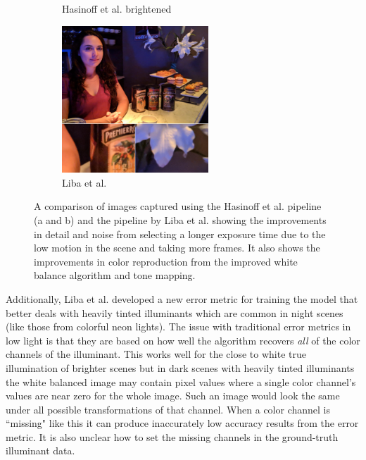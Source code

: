 \documentclass{sig-alternate}
\begin{document}
\begin{figure}
\begin{subfigure}{13pc}
\caption{Hasinoff et al. brightened}
\label{fig:libaResults:Hasinoff}
\end{subfigure}
\begin{subfigure}{13pc}
\centering
\includegraphics[width=13pc]{figures/liba2019-figure-1c-95quality.jpg}
\caption{Liba et al.}
\label{fig:libaResults:liba}
\end{subfigure}

\caption{A comparison of images captured using the Hasinoff et al. pipeline (a and b) and the pipeline by Liba et al. showing the improvements in detail and noise from selecting a longer exposure time due to the low motion in the scene and taking more frames. It also shows the improvements in color reproduction from the improved white balance algorithm and tone mapping.~\cite{Liba2019}}


\label{fig:libaResults}
\end{figure}

Additionally, Liba et al. developed a new error metric for training the model that better deals with heavily tinted illuminants which are common in night scenes (like those from colorful neon lights). The issue with traditional error metrics in low light is that they are based on how well the algorithm recovers \emph{all} of the color channels of the illuminant. This works well for the close to white true illumination of brighter scenes but in dark scenes with heavily tinted illuminants the white balanced image may contain pixel values where a single color channel's values are near zero for the whole image. Such an image would look the same under all possible transformations of that channel. When a color channel is ``missing" like this it can produce inaccurately low accuracy results from the error metric. It is also unclear how to set the missing channels in the ground-truth illuminant data.~\cite{Liba2019}
\end{document}
